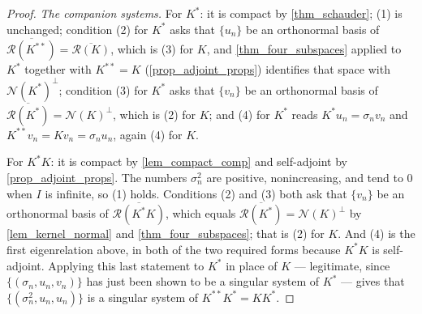 \documentclass[a4paper]{report}
\theoremstyle{plain}
\theoremstyle{definition}
\theoremstyle{remark}
\begin{document}
\begin{proof}
  \emph{The companion systems.}  For $K^*$: it is compact by \cref{thm_schauder}; (1) is
  unchanged; condition (2) for $K^*$ asks that $\{u_n\}$ be an orthonormal basis of
  $\overline{\mathcal{R}(K^{**})} = \overline{\mathcal{R}(K)}$, which is (3) for $K$, and
  \cref{thm_four_subspaces} applied to $K^*$ together with $K^{**} = K$
  (\cref{prop_adjoint_props}) identifies that space with $\mathcal{N}(K^*)^\perp$;
  condition (3) for $K^*$ asks that $\{v_n\}$ be an orthonormal basis of
  $\overline{\mathcal{R}(K^*)} = \mathcal{N}(K)^\perp$, which is (2) for $K$; and (4) for
  $K^*$ reads $K^*u_n = \sigma_nv_n$ and $K^{**}v_n = Kv_n = \sigma_nu_n$, again (4) for
  $K$.

  For $K^*K$: it is compact by \cref{lem_compact_comp} and self-adjoint by
  \cref{prop_adjoint_props}.  The numbers $\sigma_n^2$ are positive, nonincreasing, and
  tend to $0$ when $I$ is infinite, so (1) holds.  Conditions (2) and (3) both ask that
  $\{v_n\}$ be an orthonormal basis of $\overline{\mathcal{R}(K^*K)}$, which equals
  $\overline{\mathcal{R}(K^*)} = \mathcal{N}(K)^\perp$ by \cref{lem_kernel_normal} and
  \cref{thm_four_subspaces}; that is (2) for $K$.  And (4) is the first eigenrelation
  above, in both of the two required forms because $K^*K$ is self-adjoint.  Applying this
  last statement to $K^*$ in place of $K$ --- legitimate, since $\{(\sigma_n,u_n,v_n)\}$
  has just been shown to be a singular system of $K^*$ --- gives that
  $\{(\sigma_n^2,u_n,u_n)\}$ is a singular system of $K^{**}K^* = KK^*$.
\end{proof}
\end{document}
